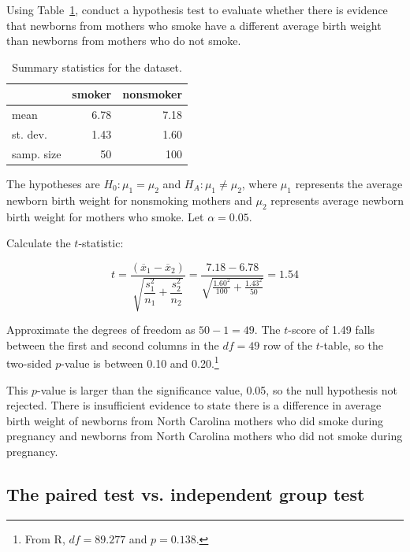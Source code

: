 \begin{example}{Using Table~\ref{summaryStatsBabySmoke}, conduct a hypothesis test to evaluate whether there is evidence that newborns from mothers who smoke have a different average birth weight than newborns from mothers who do not smoke. 
		
\begin{table}[hhh]
	\centering
	\begin{tabular}{lrr}
		& smoker & nonsmoker \\
		\hline
		mean & 6.78 & 7.18 \\
		st. dev. & 1.43 & 1.60 \\
		samp. size & 50 & 100 \\
		\hline
	\end{tabular}
	\caption{Summary statistics for the  dataset.}
	\label{summaryStatsBabySmoke}
\end{table}		

}

The hypotheses are $H_0: \mu_{1} = \mu_{2}$ and $H_A: \mu_{1} \neq \mu_{2}$, where $\mu_{1}$ represents the average newborn birth weight for nonsmoking mothers and $\mu_{2}$ represents average newborn birth weight for mothers who smoke. Let $\alpha = 0.05$. 	

Calculate the $t$-statistic:

\[t = \dfrac{(\overline{x}_1 - \overline{x}_2)}{\sqrt{\dfrac{s_{1}^{2}}{n_1} + \dfrac{s_{2}^{2}}{n_2}}} = \dfrac{7.18 - 6.78}{\sqrt{\frac{1.60^2}{100} + \frac{1.43^2}{50}}} = 1.54\]

Approximate the degrees of freedom as $50 - 1 = 49$. The $t$-score of 1.49 falls between the first and second columns in the $df = 49$ row of the $t$-table, so the two-sided $p$-value is between 0.10 and 0.20.\footnote{From \textsf{R}, $df = 89.277$ and $p = 0.138$.}

This $p$-value is larger than the significance value, 0.05, so the null hypothesis not rejected. There is insufficient evidence to state there is a difference in average birth weight of newborns from North Carolina mothers who did smoke during pregnancy and newborns from North Carolina mothers who did not smoke during pregnancy.
\end{example}



\subsection{The paired test vs. independent group test}
\label{pairedVsTwoGroups}

